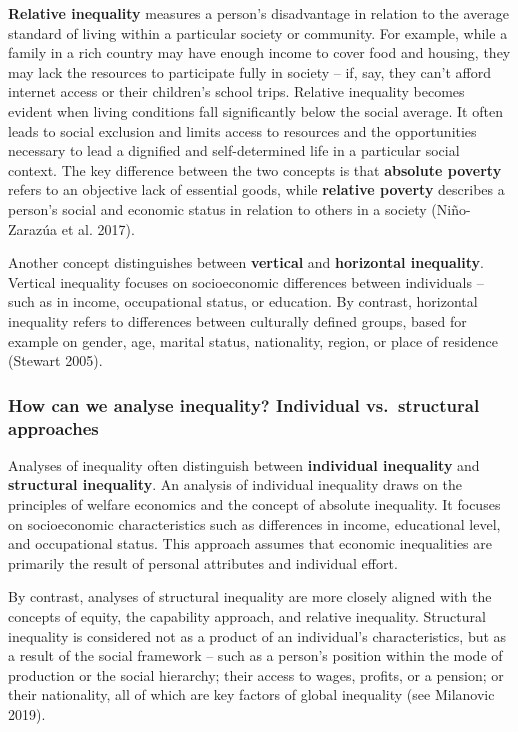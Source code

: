 \documentclass[
  a4paper,
  DIV=11,
  numbers=noendperiod,
  oneside,
  openany]{scrreprt}
\begin{document}
\textbf{Relative inequality} measures a person's disadvantage in
relation to the average standard of living within a particular society
or community. For example, while a family in a rich country may have
enough income to cover food and housing, they may lack the resources to
participate fully in society -- if, say, they can't afford internet
access or their children's school trips. Relative inequality becomes
evident when living conditions fall significantly below the social
average. It often leads to social exclusion and limits access to
resources and the opportunities necessary to lead a dignified and
self-determined life in a particular social context. The key difference
between the two concepts is that \textbf{absolute poverty} refers to an
objective lack of essential goods, while \textbf{relative poverty}
describes a person's social and economic status in relation to others in
a society (Niño-Zarazúa et al. 2017).

Another concept distinguishes between \textbf{vertical} and
\textbf{horizontal inequality}. Vertical inequality focuses on
socioeconomic differences between individuals -- such as in income,
occupational status, or education. By contrast, horizontal inequality
refers to differences between culturally defined groups, based for
example on gender, age, marital status, nationality, region, or place of
residence (Stewart 2005).

\subsubsection{How can we analyse inequality? Individual vs.~structural
approaches}\label{how-can-we-analyse-inequality-individual-vs.-structural-approaches}

Analyses of inequality often distinguish between \textbf{individual
inequality} and \textbf{structural inequality}. An analysis of
individual inequality draws on the principles of welfare economics and
the concept of absolute inequality. It focuses on socioeconomic
characteristics such as differences in income, educational level, and
occupational status. This approach assumes that economic inequalities
are primarily the result of personal attributes and individual effort.

By contrast, analyses of structural inequality are more closely aligned
with the concepts of equity, the capability approach, and relative
inequality. Structural inequality is considered not as a product of an
individual's characteristics, but as a result of the social framework --
such as a person's position within the mode of production or the social
hierarchy; their access to wages, profits, or a pension; or their
nationality, all of which are key factors of global inequality (see
Milanovic 2019).
\end{document}
